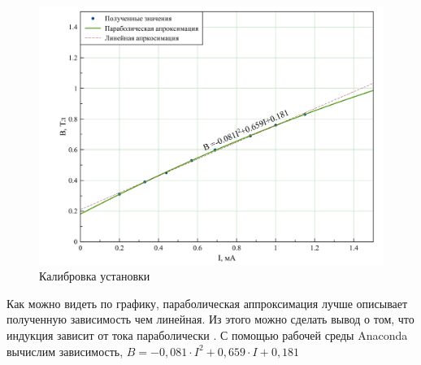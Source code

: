 \documentclass[a4paper, 12pt]{article}
\begin{document}
	\begin {figure}[H]
	\label{graph1}
		\begin{center}
			\includegraphics[width = 0.9 \textwidth]{graph1.png}
			\caption{Калибровка установки}
		\end{center}
	\end {figure}
Как можно видеть по графику, параболическая аппроксимация лучше описывает полученную зависимость чем линейная. Из этого можно сделать вывод о том, что индукция зависит от тока параболически . С помощью рабочей среды Anaconda вычислим зависимость, $B = -0,081\cdot I^2+0,659\cdot I+0,181$
\end{document}
